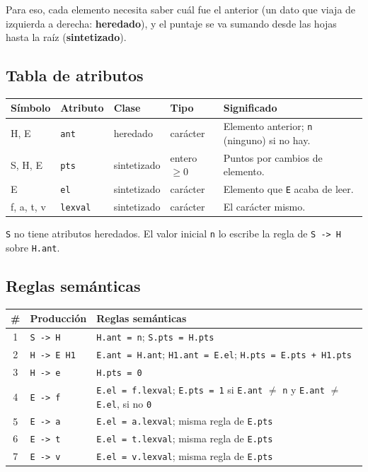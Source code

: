 \documentclass[11pt,a4paper]{article}
\newcommand{\code}[1]{\texttt{#1}}
\begin{document}
Para eso, cada elemento necesita saber cuál fue el anterior (un dato que viaja de izquierda a derecha: \textbf{heredado}), y el puntaje se va sumando desde las hojas hasta la raíz (\textbf{sintetizado}).

\subsection{Tabla de atributos}

\begin{center}
\begin{tabularx}{\textwidth}{@{}llllX@{}}
\toprule
Símbolo & Atributo & Clase & Tipo & Significado \\
\midrule
H, E & \code{ant} & heredado & carácter & Elemento anterior; \code{n} (ninguno) si no hay. \\
S, H, E & \code{pts} & sintetizado & entero $\geq 0$ & Puntos por cambios de elemento. \\
E & \code{el} & sintetizado & carácter & Elemento que \code{E} acaba de leer. \\
f, a, t, v & \code{lexval} & sintetizado & carácter & El carácter mismo. \\
\bottomrule
\end{tabularx}
\end{center}

\code{S} no tiene atributos heredados. El valor inicial \code{n} lo escribe la regla de \code{S -> H} sobre \code{H.ant}.

\subsection{Reglas semánticas}

\begin{center}
\begin{tabular}{@{}cll@{}}
\toprule
\# & Producción & Reglas semánticas \\
\midrule
1 & \code{S -> H} & \code{H.ant = n}; \code{S.pts = H.pts} \\
2 & \code{H -> E H1} & \code{E.ant = H.ant}; \code{H1.ant = E.el}; \code{H.pts = E.pts + H1.pts} \\
3 & \code{H -> e} & \code{H.pts = 0} \\
4 & \code{E -> f} & \code{E.el = f.lexval}; \code{E.pts = 1} si \code{E.ant} $\neq$ \code{n} y \code{E.ant} $\neq$ \code{E.el}, si no \code{0} \\
5 & \code{E -> a} & \code{E.el = a.lexval}; misma regla de \code{E.pts} \\
6 & \code{E -> t} & \code{E.el = t.lexval}; misma regla de \code{E.pts} \\
7 & \code{E -> v} & \code{E.el = v.lexval}; misma regla de \code{E.pts} \\
\bottomrule
\end{tabular}
\end{center}
\end{document}

